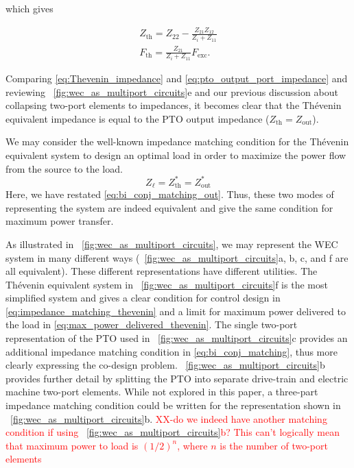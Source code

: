\documentclass[lettersize,journal]{IEEEtran}
\newcommand{\rc}[1]{\textcolor{red}{#1}}
\begin{document}
\noindent{}which gives

\begin{subequations}
        \begin{gather}
                Z_{\textrm{th}} = Z_{22} - \frac{Z_{21} Z_{12}}{Z_{i} + Z_{11}} \label{eq:Thevenin_impedance} \\
                F_{\textrm{th}} = \frac{Z_{21}}{Z_i + Z_{11}}F_{\textrm{exc}} . \label{eq:Thevenin_force}
        \end{gather}
\end{subequations}

\noindent{}Comparing \eqref{eq:Thevenin_impedance} and \eqref{eq:pto_output_port_impedance} and reviewing \figurename~\ref{fig:wec_as_multiport_circuits}e and our previous discussion about collapsing two-port elements to impedances, it becomes clear that the Th\'{e}venin equivalent impedance is equal to the PTO output impedance ($Z_{\textrm{th}} = Z_{\textrm{out}}$).

We may consider the well-known impedance matching condition for the Th\'{e}venin equivalent system to design an optimal load in order to maximize the power flow from the source to the load.
\begin{equation}
        Z_\ell = Z_{\textrm{th}}^* = Z_{\textrm{out}}^*
        \label{eq:impedance_matching_thevenin}
\end{equation}
\noindent{}Here, we have restated \eqref{eq:bi_conj_matching_out}.
Thus, these two modes of representing the system are indeed equivalent and give the same condition for maximum power transfer.

As illustrated in \figurename~\ref{fig:wec_as_multiport_circuits}, we may represent the WEC system in many different ways (\figurename~\ref{fig:wec_as_multiport_circuits}a, b, c, and f are all equivalent).
These different representations have different utilities.
The Th\'{e}venin equivalent system in \figurename~\ref{fig:wec_as_multiport_circuits}f is the most simplified system and gives a clear condition for control design in \eqref{eq:impedance_matching_thevenin} and a limit for maximum power delivered to the load in \eqref{eq:max_power_delivered_thevenin}.
The single two-port representation of the PTO used in \figurename~\ref{fig:wec_as_multiport_circuits}c provides an additional impedance matching condition in \eqref{eq:bi_conj_matching}, thus more clearly expressing the co-design problem.
\figurename~\ref{fig:wec_as_multiport_circuits}b provides further detail by splitting the PTO into separate drive-train and electric machine two-port elements.
While not explored in this paper, a three-part impedance matching condition could be written for the representation shown in \figurename~\ref{fig:wec_as_multiport_circuits}b.
\rc{XX-do we indeed have another matching condition if using \figurename~\ref{fig:wec_as_multiport_circuits}b? This can't logically mean that maximum power to load is $(1/2)^n$, where $n$ is the number of two-port elements}
\end{document}
